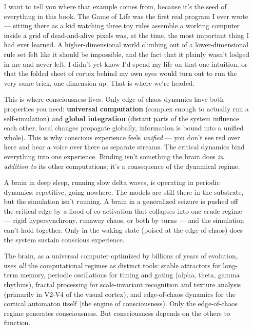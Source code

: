 \documentclass[11pt, twoside, openright]{book}
\begin{document}
I want to tell you where that example comes from, because it's the seed of everything in this book. The Game of Life was the first real program I ever wrote --- sitting there as a kid watching three toy rules assemble a working computer inside a grid of dead-and-alive pixels was, at the time, the most important thing I had ever learned. A higher-dimensional world climbing out of a lower-dimensional rule set felt like it should be impossible, and the fact that it plainly wasn't lodged in me and never left. I didn't yet know I'd spend my life on that one intuition, or that the folded sheet of cortex behind my own eyes would turn out to run the very same trick, one dimension up. That is where we're headed.

This is where consciousness lives. Only edge-of-chaos dynamics have both properties you need: \textbf{universal computation} (complex enough to actually run a self-simulation) and \textbf{global integration} (distant parts of the system influence each other, local changes propagate globally, information is bound into a unified whole). This is why conscious experience feels \textit{unified} --- you don't see red over here and hear a voice over there as separate streams. The critical dynamics bind everything into one experience. Binding isn't something the brain does \textit{in addition to} its other computations; it's a consequence of the dynamical regime.

A brain in deep sleep, running slow delta waves, is operating in periodic dynamics: repetitive, going nowhere. The models are still there in the substrate, but the simulation isn't running. A brain in a generalized seizure is pushed off the critical edge by a flood of co-activation that collapses into one crude regime --- rigid hypersynchrony, runaway chaos, or both by turns --- and the simulation can't hold together. Only in the waking state (poised at the edge of chaos) does the system sustain conscious experience.

The brain, as a universal computer optimized by billions of years of evolution, uses \textit{all} the computational regimes as distinct tools: stable attractors for long-term memory, periodic oscillations for timing and gating (alpha, theta, gamma rhythms), fractal processing for scale-invariant recognition and texture analysis (primarily in V2-V4 of the visual cortex), and edge-of-chaos dynamics for the cortical automaton itself (the engine of consciousness). Only the edge-of-chaos regime generates consciousness. But consciousness depends on the others to function.
\end{document}
